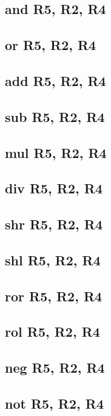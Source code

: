 \documentclass{article}
\begin{document}
    \subsection{and R5, R2, R4} \label{AND}
        
    \subsection{or R5, R2, R4} \label{OR}
        
    \subsection{add R5, R2, R4} \label{ADD}
        
    \subsection{sub R5, R2, R4} \label{SUB}
        
    \subsection{mul R5, R2, R4} \label{MUL}
        
    \subsection{div R5, R2, R4} \label{DIV}
        
    \subsection{shr R5, R2, R4} \label{SHR}
        
    \subsection{shl R5, R2, R4} \label{SHL}
        
    \subsection{ror R5, R2, R4} \label{ROR}
        
    \subsection{rol R5, R2, R4} \label{ROL}
        
    \subsection{neg R5, R2, R4} \label{NEG}
        
    \subsection{not R5, R2, R4} \label{NOT}
        
\end{document}
